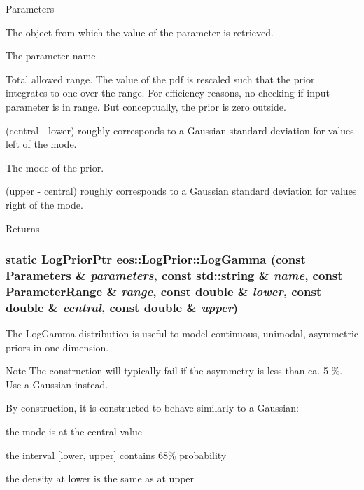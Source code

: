 \begin{DoxyParams}{Parameters}
\item[{\em parameters}]The object from which the value of the parameter is retrieved. \item[{\em name}]The parameter name. \item[{\em range}]Total allowed range. The value of the pdf is rescaled such that the prior integrates to one over the range. For efficiency reasons, no checking if input parameter is in range. But conceptually, the prior is zero outside. \item[{\em lower}](central -\/ lower) roughly corresponds to a Gaussian standard deviation for values left of the mode. \item[{\em central}]The mode of the prior. \item[{\em upper}](upper -\/ central) roughly corresponds to a Gaussian standard deviation for values right of the mode. \end{DoxyParams}
\begin{DoxyReturn}{Returns}

\end{DoxyReturn}
\hypertarget{classeos_1_1LogPrior_af659eae53a9474695a8abadd62f82a94}{
\subsubsection[{LogGamma}]{\setlength{\rightskip}{0pt plus 5cm}static {\bf LogPriorPtr} eos::LogPrior::LogGamma (const {\bf Parameters} \& {\em parameters}, \/  const std::string \& {\em name}, \/  const {\bf ParameterRange} \& {\em range}, \/  const double \& {\em lower}, \/  const double \& {\em central}, \/  const double \& {\em upper})}}
\label{classeos_1_1LogPrior_af659eae53a9474695a8abadd62f82a94}
The LogGamma distribution is useful to model continuous, unimodal, asymmetric priors in one dimension.

\begin{DoxyNote}{Note}
The construction will typically fail if the asymmetry is less than ca. 5 \%. Use a Gaussian instead.
\end{DoxyNote}
By construction, it is constructed to behave similarly to a Gaussian:
\begin{DoxyItemize}
\item the mode is at the central value
\item the interval \mbox{[}lower, upper\mbox{]} contains 68\% probability
\item the density at lower is the same as at upper
\end{DoxyItemize}


